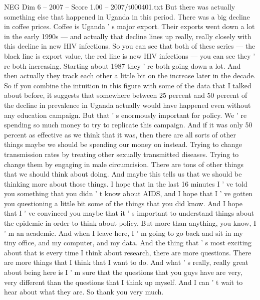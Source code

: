 \begin{textsample}{NEG Dim 6 – 2007 – Score 1.00 – 2007/t000401.txt}
But there was actually something else that happened in Uganda in this period.
There was a big decline in coffee prices.
Coffee is Uganda ' s major export.
Their exports went down a lot in the early 1990s — and actually that decline lines up really, really closely with this decline in new HIV infections.
So you can see that both of these series — the black line is export value, the red line is new HIV infections — you can see they ' re both increasing.
Starting about 1987 they ' re both going down a lot.
And then actually they track each other a little bit on the increase later in the decade.
So if you combine the intuition in this figure with some of the data that I talked about before, it suggests that somewhere between 25 percent and 50 percent of the decline in prevalence in Uganda actually would have happened even without any education campaign.
But that ' s enormously important for policy.
We ' re spending so much money to try to replicate this campaign.
And if it was only 50 percent as effective as we think that it was, then there are all sorts of other things maybe we should be spending our money on instead.
Trying to change transmission rates by treating other sexually transmitted diseases.
Trying to change them by engaging in male circumcision.
There are tons of other things that we should think about doing.
And maybe this tells us that we should be thinking more about those things.
I hope that in the last 16 minutes I ' ve told you something that you didn ' t know about AIDS, and I hope that I ' ve gotten you questioning a little bit some of the things that you did know.
And I hope that I ' ve convinced you maybe that it ' s important to understand things about the epidemic in order to think about policy.
But more than anything, you know, I ' m an academic.
And when I leave here, I ' m going to go back and sit in my tiny office, and my computer, and my data.
And the thing that ' s most exciting about that is every time I think about research, there are more questions.
There are more things that I think that I want to do.
And what ' s really, really great about being here is I ' m sure that the questions that you guys have are very, very different than the questions that I think up myself.
And I can ' t wait to hear about what they are.
So thank you very much.

\end{textsample}
